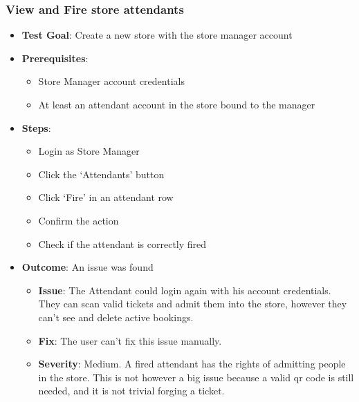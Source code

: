 \subsubsection{View and Fire store attendants}
\begin{itemize}
    \item \textbf{Test Goal}: Create a new store with the store manager account
    \item \textbf{Prerequisites}:
          \begin{itemize}
              \item Store Manager account credentials
              \item At least an attendant account in the store bound to the manager
          \end{itemize}
    \item \textbf{Steps}:
          \begin{itemize}
              \item Login as Store Manager
              \item Click the `Attendants' button
              \item Click `Fire' in an attendant row
              \item Confirm the action
              \item Check if the attendant is correctly fired
          \end{itemize}
    \item \textbf{Outcome}:  An issue was found
          \begin{itemize}
              \item \textbf{Issue}: The Attendant could login again with his account credentials. They can scan valid tickets and admit them into the store, however they can't see and
                    delete active bookings.
              \item \textbf{Fix}: The user can't fix this issue manually.
              \item \textbf{Severity}: Medium. A fired attendant has the rights of admitting people in the store. This is not however a big issue because a valid qr code is still needed, and it is not trivial forging a ticket.
          \end{itemize}
\end{itemize}

\clearpage

